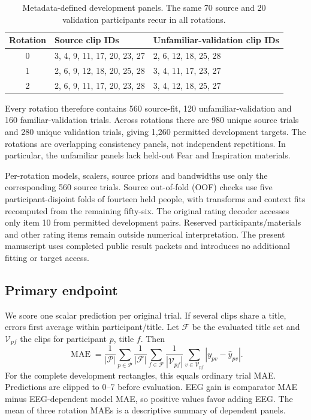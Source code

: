 \documentclass[conference]{IEEEtran}
\newcommand{\mae}{\operatorname{MAE}}
\begin{document}
\begin{table}[t]
\centering
\caption{Metadata-defined development panels. The same 70 source and 20 validation participants recur in all rotations.}
\label{tab:splits}
\scriptsize
\begin{tabular}{cll}
\toprule
Rotation & Source clip IDs & Unfamiliar-validation clip IDs\\
\midrule
0 & 3, 4, 9, 11, 17, 20, 23, 27 & 2, 6, 12, 18, 25, 28\\
1 & 2, 6, 9, 12, 18, 20, 25, 28 & 3, 4, 11, 17, 23, 27\\
2 & 2, 6, 9, 11, 17, 20, 23, 28 & 3, 4, 12, 18, 25, 27\\
\bottomrule
\end{tabular}
\end{table}

Every rotation therefore contains 560 source-fit, 120 unfamiliar-validation and 160 familiar-validation trials. Across rotations there are 980 unique source trials and 280 unique validation trials, giving 1,260 permitted development targets. The rotations are overlapping consistency panels, not independent repetitions. In particular, the unfamiliar panels lack held-out Fear and Inspiration materials.

Per-rotation models, scalers, source priors and bandwidths use only the corresponding 560 source trials. Source out-of-fold (OOF) checks use five participant-disjoint folds of fourteen held people, with transforms and context fits recomputed from the remaining fifty-six. The original rating decoder accesses only item 10 from permitted development pairs. Reserved participants/materials and other rating items remain outside numerical interpretation. The present manuscript uses completed public result packets and introduces no additional fitting or target access.

\subsection{Primary endpoint}
We score one scalar prediction per original trial. If several clips share a title, errors first average within participant/title. Let \(\mathcal{F}\) be the evaluated title set and \(\mathcal{V}_{pf}\) the clips for participant \(p\), title \(f\). Then
\begin{equation}
\mae=
\frac{1}{|\mathcal{P}|}\sum_{p\in\mathcal{P}}
\frac{1}{|\mathcal{F}|}\sum_{f\in\mathcal{F}}
\frac{1}{|\mathcal{V}_{pf}|}\sum_{v\in\mathcal{V}_{pf}}
|y_{pv}-\widehat y_{pv}|.
\end{equation}
For the complete development rectangles, this equals ordinary trial MAE. Predictions are clipped to 0--7 before evaluation. EEG gain is comparator MAE minus EEG-dependent model MAE, so positive values favor adding EEG. The mean of three rotation MAEs is a descriptive summary of dependent panels.
\end{document}
